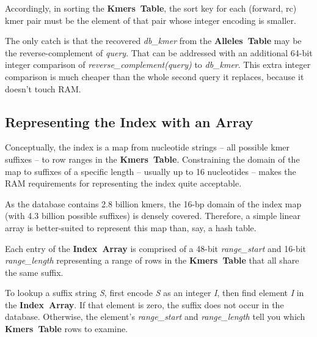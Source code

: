 \documentclass[10pt]{article}
\newcommand\figurebreak{}
\newcommand\datastructure[1]{\hbox{\textbf{#1}}}
\newcommand\AllelesTable{\datastructure{Alleles Table}}
\newcommand\KmersTable{\datastructure{Kmers Table}}
\newcommand\IndexArray{\datastructure{Index Array}}
\newcommand\var[1]{\hbox{\textsl{#1}}}
\begin{document}
Accordingly, in sorting the \KmersTable{}, the sort key for each (forward, rc) kmer pair must be the element of that pair whose integer encoding is smaller.

The only catch is that the recovered \var{db_kmer} from the \AllelesTable{} may be the reverse-complement of \var{query}.  That can be addressed with an additional 64-bit integer comparison of \var{reverse_complement(query)} to \var{db_kmer}.  This extra integer comparison is much cheaper than the whole second query it replaces, because it doesn't touch RAM.

\pagebreak

\subsection{Representing the Index with an Array}

Conceptually, the index is a map from nucleotide strings -- all possible kmer suffixes -- to row ranges in the \KmersTable{}.  Constraining the domain of the map to suffixes of a specific length -- usually up to 16 nucleotides -- makes the RAM requirements for representing the index quite acceptable.

As the database contains 2.8 billion kmers, the 16-bp domain of the index map (with 4.3 billion possible suffixes) is densely covered.  Therefore, a simple linear array is better-suited to represent this map than, say, a hash table.

Each entry of the \IndexArray{} is comprised of a 48-bit \var{range_start} and 16-bit \var{range_length} representing a range of rows in the \KmersTable{} that all share the same suffix.

To lookup a suffix string \var{S}, first encode \var{S} as an integer \var{I}, then find element \var{I} in the \IndexArray{}.  If that element is zero, the suffix does not occur in the database. Otherwise, the element's \var{range_start} and \var{range_length} tell you which \KmersTable{} rows to examine.

\figurebreak
\end{document}
